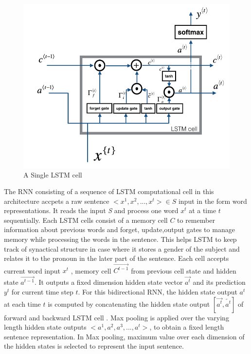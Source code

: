 \documentclass[12pt]{report} %
\begin{document}
	
	\begin{figure}[!tbp]
		\centering
		\includegraphics[scale=0.40]{image/LSTM.png}
		\caption{A Single LSTM cell \citep{SeqMod2018Andrew}}
		\label{lstm}
	\end{figure}
	
	 The RNN consisting of a sequence of LSTM computational cell in this architecture accpets a raw sentence $<x^{1},x^{2},...,x^{t}> \in S$ input in the form word representations. It reads the input \textit{S} and process one word $x^{t}$ at a time $t$ sequentially. Each LSTM cells consist of a memory cell $C$ to remember information about previous words and forget, update,output gates to manage memory while processing the words in the sentence. This helps LSTM to keep track of synactical structure in case where it stores a gender of the subject and relates it to the pronoun in the later part of the sentence. Each cell accepts current word input $x^{t}$ , memory cell $\overrightarrow{C^{t-1}}$ from previous cell state and hidden state $\overrightarrow{a^{t-1}}$. It outputs a fixed dimension hidden state vector $\overrightarrow{a^{t}}$ and its prediction $y^{t}$ for current time step $t$. For this bidirectional RNN, the hidden state output $ a^{t} $ at each time $ t $ is computed by concatenating the hidden state output $ [\overrightarrow{a^{t}},\overleftarrow{a^{t}}] $ of forward  and backward LSTM cell . Max pooling is applied over the varying length hidden state outputs $<a^{1},a^{2},a^{3},...,a^{t}> $, to obtain a fixed length sentence representation. In Max pooling, maximum value over each dimension of the hidden states is selected to represent the input sentence.
	
\end{document}
